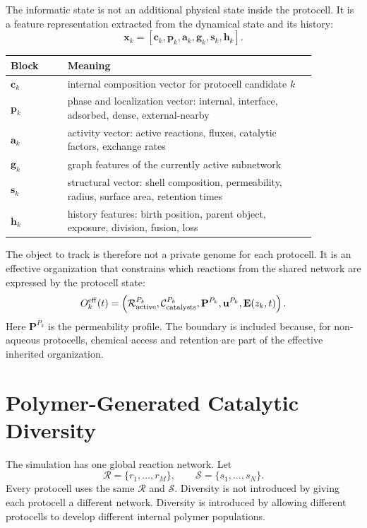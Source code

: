 \documentclass[11pt]{article}
\begin{document}
The informatic state is not an additional physical state inside the protocell. It is a feature representation extracted from the dynamical state and its history:
\begin{equation}
\mathbf{x}_k =
\left[
\mathbf{c}_k,
\mathbf{p}_k,
\mathbf{a}_k,
\mathbf{g}_k,
\mathbf{s}_k,
\mathbf{h}_k
\right].
\end{equation}

\begin{center}
\begin{tabular}{p{0.16\linewidth}p{0.70\linewidth}}
\toprule
Block & Meaning \\
\midrule
$\mathbf{c}_k$ & internal composition vector for protocell candidate $k$ \\
$\mathbf{p}_k$ & phase and localization vector: internal, interface, adsorbed, dense, external-nearby \\
$\mathbf{a}_k$ & activity vector: active reactions, fluxes, catalytic factors, exchange rates \\
$\mathbf{g}_k$ & graph features of the currently active subnetwork \\
$\mathbf{s}_k$ & structural vector: shell composition, permeability, radius, surface area, retention times \\
$\mathbf{h}_k$ & history features: birth position, parent object, exposure, division, fusion, loss \\
\bottomrule
\end{tabular}
\end{center}

The object to track is therefore not a private genome for each protocell. It is an effective organization that constrains which reactions from the shared network are expressed by the protocell state:
\begin{equation}
O_k^{\rm eff}(t) =
\left(
\mathcal{R}_{\rm active}^{P_k},
\mathcal{C}_{\rm catalysts}^{P_k},
\mathbf{P}^{P_k},
\mathbf{u}^{P_k},
\mathbf{E}(z_k,t)
\right).
\end{equation}
Here $\mathbf{P}^{P_k}$ is the permeability profile. The boundary is included because, for non-aqueous protocells, chemical access and retention are part of the effective inherited organization.

\section{Polymer-Generated Catalytic Diversity}

The simulation has one global reaction network. Let
\begin{equation}
\mathcal{R}=\{r_1,\ldots,r_M\},
\qquad
\mathcal{S}=\{s_1,\ldots,s_N\}.
\end{equation}
Every protocell uses the same $\mathcal{R}$ and $\mathcal{S}$. Diversity is not introduced by giving each protocell a different network. Diversity is introduced by allowing different protocells to develop different internal polymer populations.
\end{document}
